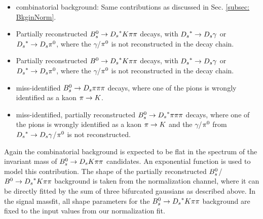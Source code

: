 \begin{itemize}

\item combinatorial background: Same contributions as discussed in Sec. \ref{subsec: BkginNorm}.

\item Partially reconstructed ${{B}^0_{s}}\rightarrow{\ensuremath{{D}_{s}}}^{*}{K}{\pi}{\pi}$ decays, with ${{D}_{s}}^{*}\rightarrow{\ensuremath{{D}_{s}}}\gamma$ or ${{D}_{s}}^{*}\rightarrow{\ensuremath{{D}_{s}}}{\ensuremath{{\pi}^0}}$, where the $\gamma$/${{\pi}^0}$ is not reconstructed in the decay chain. 

\item Partially reconstructed ${{B}^0}\rightarrow{\ensuremath{{D}_{s}}}^{*}{K}{\pi}{\pi}$ decays, with ${{D}_{s}}^{*}\rightarrow{\ensuremath{{D}_{s}}}\gamma$ or ${{D}_{s}}^{*}\rightarrow{\ensuremath{{D}_{s}}}{\ensuremath{{\pi}^0}}$, where the $\gamma$/${{\pi}^0}$ is not reconstructed in the decay chain.

\item miss-identified ${{B}^0_{s}}\rightarrow{\ensuremath{{D}_{s}}}{\ensuremath{\pi}}{\ensuremath{\pi}}{\ensuremath{\pi}}$ decays, where one of the pions is wrongly identified as a kaon ${\pi}\rightarrow{\ensuremath{K}}$.  

\item miss-identified, partially reconstructed ${{B}^0_{s}}\rightarrow{\ensuremath{{D}_{s}}}^{*}{\pi}{\pi}{\pi}$ decays, where one of the pions is wrongly identified as a kaon ${\pi}\rightarrow{\ensuremath{K}}$ and the $\gamma$/${{\pi}^0}$ from ${{D}_{s}}^{*}\rightarrow{\ensuremath{{D}_{s}}}\gamma$/${{\pi}^0}$ is 
not reconstructed.

\end{itemize}

Again the combinatorial background is expected to be flat in the spectrum of the invariant mass of ${{B}^0_{s}}\rightarrow{\ensuremath{{D}_{s}}}{\ensuremath{K}}{\ensuremath{\pi}}{\ensuremath{\pi}}$ candidates. An exponential function is used to model this contribution.\newline
The shape of the partially reconstructed ${{B}^0_{s}}$/${{B}^0}\rightarrow{\ensuremath{{D}_{s}}}^{*}{K}{\pi}{\pi}$ background is taken from the normalization channel, where it can be directly fitted by the sum of three bifurcated gaussians as described above.
In the signal massfit, all shape parameters for the ${{B}^0_{s}}\rightarrow{\ensuremath{{D}_{s}}}^{*}{K}{\pi}{\pi}$ background are fixed to the input values from our normalization fit.  


